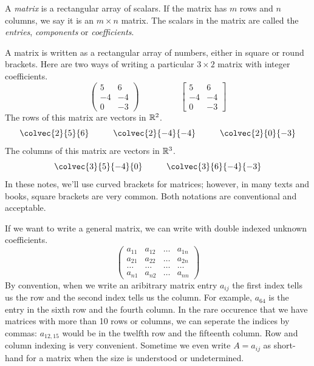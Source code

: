 \documentclass[fleqn,letterpaper]{report}
\begin{document}
\begin{defn}
A \emph{matrix} is a rectangular array of scalars. If the
matrix has $m$ rows and $n$ columns, we say it is an $m \times
n$ matrix. The scalars in the matrix are called the
\emph{entries}, \emph{components} or \emph{coefficients}.
\end{defn}

A matrix is written as a rectangular array of numbers,
either in square or round brackets. Here are two
ways of writing a particular $3\times 2$ matrix with integer
coefficients.
\begin{displaymath}
\left(
\begin{matrix}
5 & 6 \\
-4 & -4 \\
0 & -3 
\end{matrix}
\right)
\hspace{2cm}
\left[
\begin{matrix}
5 & 6 \\
-4 & -4 \\
0 & -3 
\end{matrix}
\right]
\end{displaymath}
The rows of this matrix are vectors in $\mathbb{R}^2$.
\begin{displaymath}
\colvec{2}{5}{6} \hspace{1cm} 
\colvec{2}{-4}{-4} \hspace{1cm}
\colvec{2}{0}{-3} 
\end{displaymath}
The columns of this matrix are vectors in $\mathbb{R}^3$.
\begin{displaymath}
\colvec{3}{5}{-4}{0} \hspace{1cm}
\colvec{3}{6}{-4}{-3}
\end{displaymath}
In these notes, we'll use curved brackets for matrices;
however, in many texts and books, square brackets
are very common. Both notations are conventional and
acceptable.

If we want to write a general matrix, we can write with double
indexed unknown coefficients.
\begin{displaymath}
\left(
\begin{array}{cccc}
a_{11} & a_{12} & \ldots & a_{1n} \\
a_{21} & a_{22} & \ldots & a_{2n} \\
\ldots & \ldots & \ldots & \ldots \\
a_{n1} & a_{n2} & \ldots & a_{nn} 
\end{array}
\right)
\end{displaymath}
By convention, when we write an aribitrary matrix entry $a_{ij}$
the first index tells us the row and the second index tells us
the column. For example, $a_{64}$ is the entry in the sixth row
and the fourth column. In the rare occurence that we have
matrices with more than 10 rows or columns, we can seperate the
indices by commas: $a_{12,15}$ would be in the twelfth row and
the fifteenth column. Row and column indexing is very
convenient. Sometime we even write $A = a_{ij}$ as short-hand
for a matrix when the size is understood or undetermined.
\end{document}
